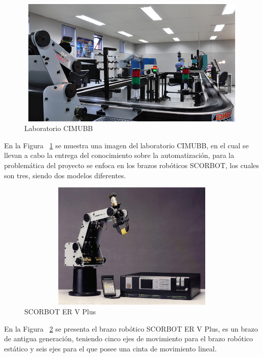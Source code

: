 \begin{figure}[ht]
\centering
\includegraphics[width=13cm, height=6.1cm]{figures/cimubb.jpg}
\caption{Laboratorio CIMUBB}
\label{fig:cimubb}
\end{figure}

En la Figura ~\ref{fig:cimubb} se muestra una imagen del laboratorio CIMUBB, en el cual se llevan a cabo la entrega del conocimiento sobre la automatización, para la problemática del proyecto se enfoca en los brazos robóticos SCORBOT, los cuales son tres, siendo dos modelos diferentes.

\begin{figure}[ht]
\centering
\includegraphics[width=13cm, height=6.1cm]{figures/scor5p.jpg}
\caption{SCORBOT ER V Plus}
\label{fig:scor5p}
\end{figure}

 En la Figura ~\ref{fig:scor5p} se presenta el brazo robótico SCORBOT ER V Plus, es un brazo de antigua generación, teniendo cinco ejes de movimiento para el brazo robótico estático y seis ejes para el que posee una cinta de movimiento lineal.

\clearpage

